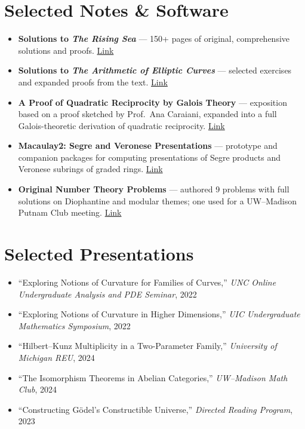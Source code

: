 \documentclass[11pt, a4paper]{article}
\newcommand{\sectionsep}{\vspace{0.28cm}}
\begin{document}
\section*{Selected Notes \& Software}
\begin{itemize}[leftmargin=*, itemsep=0.28em]
  \item \textbf{Solutions to \textit{The Rising Sea}} — 150+ pages of original, comprehensive solutions and proofs. \href{https://github.com/westbrookjack/vakil-solutions}{Link}
  \item \textbf{Solutions to \textit{The Arithmetic of Elliptic Curves}} — selected exercises and expanded proofs from the text. \href{https://github.com/westbrookjack/Solutions-to-The-Arithmetic-of-Elliptic-Curves}{Link}
  \item \textbf{A Proof of Quadratic Reciprocity by Galois Theory} — exposition based on a proof sketched by Prof.~Ana Caraiani, expanded into a full Galois-theoretic derivation of quadratic reciprocity. \href{https://github.com/westbrookjack/quadratic-reciprocity-galois}{Link}
  \item \textbf{Macaulay2: Segre and Veronese Presentations} — prototype and companion packages for computing presentations of Segre products and Veronese subrings of graded rings. \href{https://github.com/westbrookjack/VeronesePresentation}{Link}
  \item \textbf{Original Number Theory Problems} — authored 9 problems with full solutions on Diophantine and modular themes; one used for a UW–Madison Putnam Club meeting. \href{https://github.com/westbrookjack/my-NT-problems}{Link}
\end{itemize}

\sectionsep

\section*{Selected Presentations}
\begin{itemize}[leftmargin=*]
   \item “Exploring Notions of Curvature for Families of Curves,” \textit{UNC Online Undergraduate Analysis and PDE Seminar}, 2022
   \item ``Exploring Notions of Curvature in Higher Dimensions,'' \textit{UIC Undergraduate Mathematics Symposium}, 2022
  \item “Hilbert–Kunz Multiplicity in a Two-Parameter Family,” \textit{University of Michigan REU}, 2024
  \item “The Isomorphism Theorems in Abelian Categories,” \textit{UW–Madison Math Club}, 2024
  \item “Constructing Gödel’s Constructible Universe,” \textit{Directed Reading Program}, 2023
  
\end{itemize}
\end{document}

